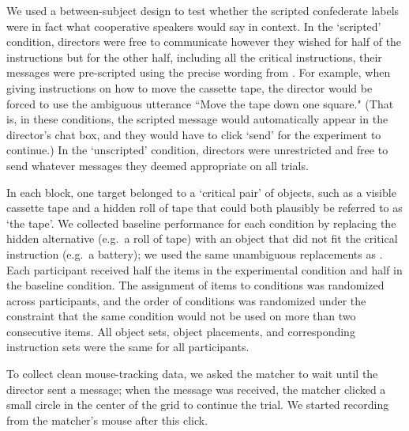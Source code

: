 \documentclass[manuscript]{stjour}
\begin{document}
We used a between-subject design to test whether the scripted confederate labels were in fact what cooperative speakers would say in context. In the `scripted' condition, directors were free to communicate however they wished for half of the instructions but for the other half, including all the critical instructions, their messages were pre-scripted using the precise wording from \cite{KeysarLinBarr03_LimitsOnTheoryOfMindUse}. For example, when giving instructions on how to move the cassette tape, the director would be forced to use the ambiguous utterance ``Move the tape down one square." (That is, in these conditions, the scripted message would automatically appear in the director's chat box, and they would have to click `send' for the experiment to continue.) In the `unscripted' condition, directors were unrestricted and free to send whatever messages they deemed appropriate on all trials.

In each block, one target belonged to a `critical pair' of objects, such as a visible cassette tape and a hidden roll of tape that could both plausibly be referred to as `the tape'. We collected baseline performance for each condition by replacing the hidden alternative (e.g.~a roll of tape) with an object that did not fit the critical instruction (e.g.~a battery); we used the same unambiguous replacements as \cite{KeysarLinBarr03_LimitsOnTheoryOfMindUse}. Each participant received half the items in the experimental condition and half in the baseline condition. The assignment of items to conditions was randomized across participants, and the order of conditions was randomized under the constraint that the same condition would not be used on more than two consecutive items. All object sets, object placements, and corresponding instruction sets were the same for all participants.




To collect clean mouse-tracking data, we asked the matcher to wait until the director sent a message; when the message was received, the matcher clicked a small circle in the center of the grid to continue the trial. We started recording from the matcher's mouse after this click. 
\end{document}
